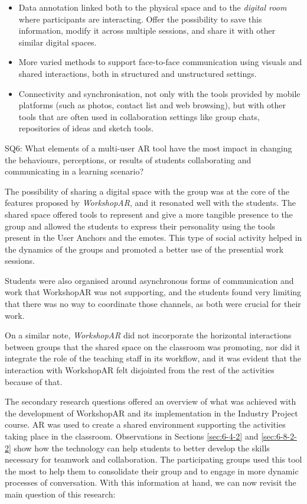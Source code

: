\begin{itemize}
    \item Data annotation linked both to the physical space and to the \emph{digital room} where participants are interacting. Offer the possibility to save this information, modify it
    across multiple sessions, and share it with other similar digital spaces.
    \item More varied methods to support face-to-face communication using visuals and shared interactions, both in structured and unstructured settings.
    \item Connectivity and synchronisation, not only with the tools provided by mobile platforms (such as photos, contact list and web browsing), but with other tools that are often used
    in collaboration settings like group chats, repositories of ideas and sketch tools.
\end{itemize}

\begin{displayquote}
    SQ6: What elements of a multi-user \ac{AR} tool have the most impact in changing the behaviours, perceptions, or results of students collaborating and communicating in a
    learning scenario? 
\end{displayquote}

The possibility of sharing a digital space with the group was at the core of the features proposed by \emph{WorkshopAR}, and it resonated well with the students. The shared space offered
tools to represent and give a more tangible presence to the group and allowed the students to express their personality using the tools present in the User Anchors and the emotes. This type
of social activity helped in the dynamics of the groups and promoted a better use of the presential work sessions.

Students were also organised around asynchronous forms of communication and work that WorkshopAR was not supporting, and the students found very limiting that there was no way to coordinate
those channels, as both were crucial for their work.

On a similar note, \emph{WorkshopAR} did not incorporate the horizontal interactions between groups that the shared space on the classroom was promoting, nor did it integrate the role of
the teaching staff in its workflow, and it was evident that the interaction with WorkshopAR felt disjointed from the rest of the activities because of that.

The secondary research questions offered an overview of what was achieved with the development of WorkshopAR and its implementation in the Industry Project course. \ac{AR} was used to create
a shared environment supporting the activities taking place in the classroom. Observations in Sections \ref{sec:6-4-2} and \ref{sec:6-8-2-2} show how the technology can help students to
better develop the skills necessary for teamwork and collaboration. The participating groups used this tool the most to help them to consolidate their group and to engage in more dynamic
processes of conversation. With this information at hand, we can now revisit the main question of this research:

